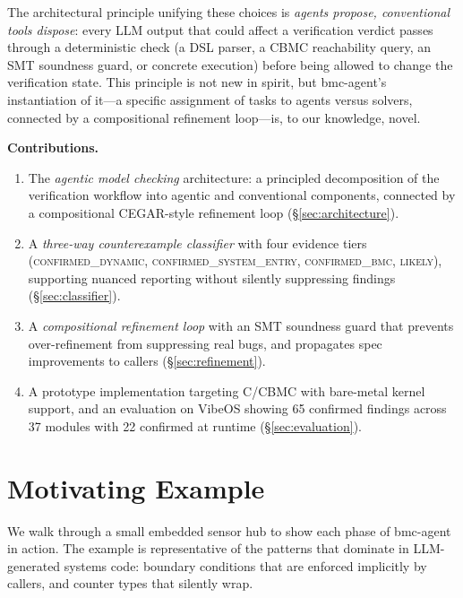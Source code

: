 \documentclass[11pt,a4paper]{article}
\newcommand{\tool}{bmc-agent\xspace}
\newcommand{\vibeos}{VibeOS\xspace}
\newcommand{\dynconf}{\textsc{confirmed\_dynamic}\xspace}
\newcommand{\sysconf}{\textsc{confirmed\_system\_entry}\xspace}
\newcommand{\bmcconf}{\textsc{confirmed\_bmc}\xspace}
\newcommand{\likelyconf}{\textsc{likely}\xspace}
\begin{document}
The architectural principle unifying these choices is \emph{agents propose,
conventional tools dispose}: every LLM output that could affect a verification
verdict passes through a deterministic check (a DSL parser, a CBMC reachability
query, an SMT soundness guard, or concrete execution) before being allowed to
change the verification state. This principle is not new in spirit, but
\tool's instantiation of it---a specific assignment of tasks to agents versus
solvers, connected by a compositional refinement loop---is, to our knowledge,
novel.

\smallskip\noindent\textbf{Contributions.}
\begin{enumerate}
\item The \emph{agentic model checking} architecture: a principled decomposition
  of the verification workflow into agentic and conventional components,
  connected by a compositional CEGAR-style refinement loop
  (\S\ref{sec:architecture}).

\item A \emph{three-way counterexample classifier} with four evidence tiers
  (\dynconf, \sysconf, \bmcconf, \likelyconf),
  supporting nuanced reporting without silently suppressing findings
  (\S\ref{sec:classifier}).

\item A \emph{compositional refinement loop} with an SMT soundness guard that
  prevents over-refinement from suppressing real bugs, and propagates spec
  improvements to callers (\S\ref{sec:refinement}).

\item A prototype implementation targeting C/CBMC with bare-metal kernel
  support, and an evaluation on \vibeos showing 65 confirmed findings across
  37 modules with 22 confirmed at runtime (\S\ref{sec:evaluation}).
\end{enumerate}

\section{Motivating Example}
\label{sec:motivating}

We walk through a small embedded sensor hub to show each phase of \tool in
action.  The example is representative of the patterns that dominate in
LLM-generated systems code: boundary conditions that are enforced implicitly
by callers, and counter types that silently wrap.
\end{document}
